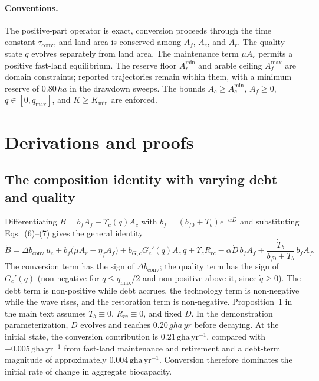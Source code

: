 \documentclass[11pt,a4paper]{article}
\newcommand{\dconv}{\Delta b_{\mathrm{conv}}}
\newcommand{\Ups}{\Upsilon_c}
\newcommand{\Acmin}{A_c^{\min}}
\newcommand{\tconv}{\tau_{\mathrm{conv}}}
\begin{document}
\paragraph{Conventions.} The positive-part operator is exact, conversion proceeds through the time constant $\tconv$, and land area is conserved among $A_f$, $A_c$, and $A_r$. The quality state $q$ evolves separately from land area. The maintenance term $\mu A_r$ permits a positive fast-land equilibrium. The reserve floor $A_r^{\min}$ and arable ceiling $A_f^{\max}$ are domain constraints; reported trajectories remain within them, with a minimum reserve of $0.80\,ha$ in the drawdown sweeps. The bounds $A_c\ge\Acmin$, $A_f\ge0$, $q\in[0,q_{\max}]$, and $K\ge K_{\min}$ are enforced.

\section{Derivations and proofs}\label{si:proofs}

\subsection{The composition identity with varying debt and quality}\label{si:identity}

Differentiating $B=b_fA_f+\Ups(q)A_c$ with $b_f=(b_{f0}+T_b)e^{-\alpha D}$ and substituting Eqs.~(6)--(7) gives the general identity
\begin{equation}\label{eq:si_identity}
\dot B=\dconv\,u_c+b_f\big(\mu A_r-\eta_fA_f\big)+b_{G,c}G_c'(q)A_c\,\dot q+\Ups R_{rc}-\alpha\dot D\,b_fA_f+\frac{\dot T_b}{b_{f0}+T_b}\,b_fA_f .
\end{equation}
The conversion term has the sign of $\dconv$; the quality term has the sign of $G_c'(q)$ (non-negative for $q\le q_{\max}/2$ and non-positive above it, since $\dot q\ge0$). The debt term is non-positive while debt accrues, the technology term is non-negative while the wave rises, and the restoration term is non-negative. Proposition~1 in the main text assumes $T_b\equiv0$, $R_{rc}\equiv0$, and fixed $D$. In the demonstration parameterization, $D$ evolves and reaches $0.20\,gha\,yr$ before decaying. At the initial state, the conversion contribution is $0.21\,\mathrm{gha\,yr^{-1}}$, compared with $-0.005\,\mathrm{gha\,yr^{-1}}$ from fast-land maintenance and retirement and a debt-term magnitude of approximately $0.004\,\mathrm{gha\,yr^{-1}}$. Conversion therefore dominates the initial rate of change in aggregate biocapacity.
\end{document}
